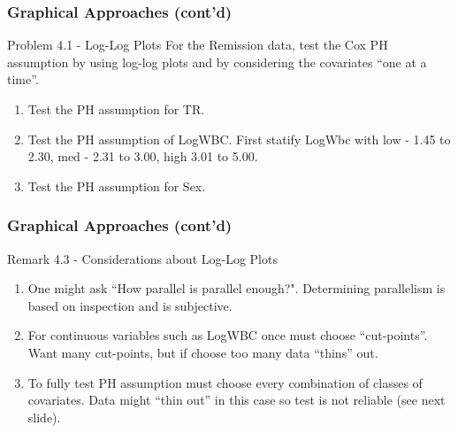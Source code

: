 \documentclass{beamer}
\theoremstyle{definition}
\begin{document}
\begin{frame}
\frametitle{Graphical Approaches (cont'd)}
\begin{block}{Problem 4.1 - Log-Log Plots}
For the Remission data, test the Cox PH assumption by using log-log plots and by considering the covariates ``one at a time''.
\begin{enumerate}
\item Test the PH assumption for TR.
\item Test the PH assumption of LogWBC. First statify LogWbc with low - 1.45 to 2.30, med - 2.31 to 3.00, high 3.01 to 5.00.
\item Test the PH assumption for Sex.
\end{enumerate}
\end{block}
\end{frame}

\begin{frame}
\frametitle{Graphical Approaches (cont'd)}
\begin{block}{Remark 4.3 - Considerations about Log-Log Plots}
\begin{enumerate}
\item  One might ask ``How parallel is parallel enough?". Determining parallelism is based on inspection and is subjective.
\item  For continuous variables such as LogWBC once must choose ``cut-points''. Want many cut-points, but if choose too many data ``thins'' out.
\item  To fully test PH assumption must choose every combination of classes of covariates. Data might ``thin out'' in this case so test is not reliable (see next slide).
\end{enumerate}
\end{block}
\end{frame}
\end{document}
